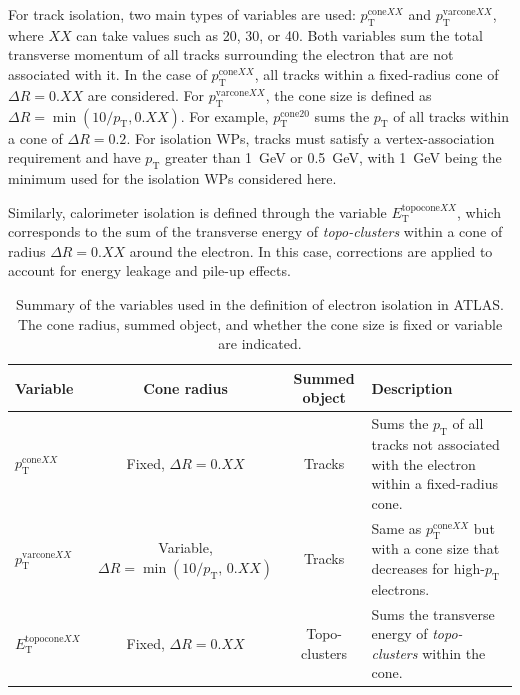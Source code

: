 For track isolation, two main types of variables are used: $p_{\mathrm{T}}^{\mathrm{cone}XX}$ and $p_{\mathrm{T}}^{\mathrm{varcone}XX}$, where $XX$ can take values such as 20, 30, or 40. Both variables sum the total transverse momentum of all tracks surrounding the electron that are not associated with it. In the case of $p_{\mathrm{T}}^{\mathrm{cone}XX}$, all tracks within a fixed-radius cone of $\Delta R = 0.XX$ are considered. For $p_{\mathrm{T}}^{\mathrm{varcone}XX}$, the cone size is defined as $\Delta R = \min(10/p_{\mathrm{T}}, 0.XX)$. For example, $p_{\mathrm{T}}^{\mathrm{cone20}}$ sums the $p_{\mathrm{T}}$ of all tracks within a cone of $\Delta R = 0.2$. For isolation WPs, tracks must satisfy a vertex-association requirement and have $p_{\mathrm{T}}$ greater than 1~GeV or 0.5~GeV, with 1~GeV being the minimum used for the isolation WPs considered here.

Similarly, calorimeter isolation is defined through the variable $E_{\mathrm{T}}^{\mathrm{topocone}XX}$, which corresponds to the sum of the transverse energy of \textit{topo-clusters} within a cone of radius $\Delta R = 0.XX$ around the electron. In this case, corrections are applied to account for energy leakage and pile-up effects.

\begin{table}[htbp]
\scriptsize
\centering
\label{tab:electron_isolation_vars}
\begin{tabular}{lccp{3cm}}
\hline
\textbf{Variable} & \textbf{Cone radius} & \textbf{Summed object} & \textbf{Description} \\
\hline
$p_{\mathrm{T}}^{\mathrm{cone}XX}$ & Fixed, $\Delta R = 0.XX$ & Tracks & Sums the $p_{\mathrm{T}}$ of all tracks not associated with the electron within a fixed-radius cone. \\
$p_{\mathrm{T}}^{\mathrm{varcone}XX}$ & Variable, $\Delta R = \min(10/p_{\mathrm{T}},\,0.XX)$ & Tracks & Same as $p_{\mathrm{T}}^{\mathrm{cone}XX}$ but with a cone size that decreases for high-$p_{\mathrm{T}}$ electrons. \\
$E_{\mathrm{T}}^{\mathrm{topocone}XX}$ & Fixed, $\Delta R = 0.XX$ & Topo-clusters & Sums the transverse energy of \textit{topo-clusters} within the cone. \\
\hline
\end{tabular}
\caption{Summary of the variables used in the definition of electron isolation in ATLAS. The cone radius, summed object, and whether the cone size is fixed or variable are indicated.}
\end{table}


